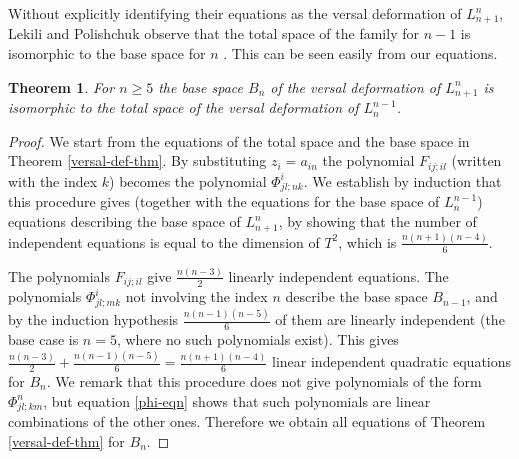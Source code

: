 \documentclass[12pt,a4paper]{amsart}  %
\newtheorem{thm}{Theorem}[section]
\theoremstyle{definition}
\theoremstyle{remark}
\begin{document}
Without explicitly identifying their equations as the versal deformation of $L_{n+1}^n$,
Lekili and Polishchuk observe that the total space of the family for $n-1$
is isomorphic to the base space for $n$ \cite[Prop.~1.1.5 (ii)]{LP}. 
This can be seen easily from our equations.

\begin{thm}\label{thm:basetotal}
For $n\geq 5$ 
the base space $B_n$ of the versal deformation of $L_{n+1}^n$
is  isomorphic to 
the total space of the versal deformation of $L_{n}^{n-1}$.
\end{thm}
\begin{proof}
We start from the equations of the total space and the base space
in Theorem \ref{versal-def-thm}.
By substituting $z_i=a_{in}$ the polynomial $F_{ij;il}$ (written with the index $k$)
becomes  the polynomial $\Phi^i_{jl;nk}$. 
We establish by induction that this procedure gives (together with the equations for the base space of $L_{n}^{n-1}$) equations describing the base space of $L_{n+1}^n$,
by showing that the number of independent equations  is equal to the
dimension of $T^2$, which is $\frac{n(n+1)(n-4)}6$.

The polynomials $F_{ij;il}$  give
$\frac{n(n-3)}2$ linearly independent equations.
The polynomials  $\Phi^i_{jl;mk}$ not involving the index $n$ describe
the base space $B_{n-1}$, and  by the induction hypothesis $\frac{n(n-1)(n-5)}6$  of them are linearly independent (the base case is $n=5$, where no such polynomials exist).
This gives   $\frac{n(n-3)}2+
\frac{n(n-1)(n-5)}6= \frac{n(n+1)(n-4)}6$ linear independent quadratic
equations for $B_n$. 
We remark that this procedure does not give polynomials of the form  $\Phi^n_{jl;km}$,
but equation \eqref{phi-eqn} shows that such polynomials are linear combinations
of the other ones. Therefore we obtain all equations of  Theorem \ref{versal-def-thm}
for $B_n$.
\end{proof}
\end{document}
